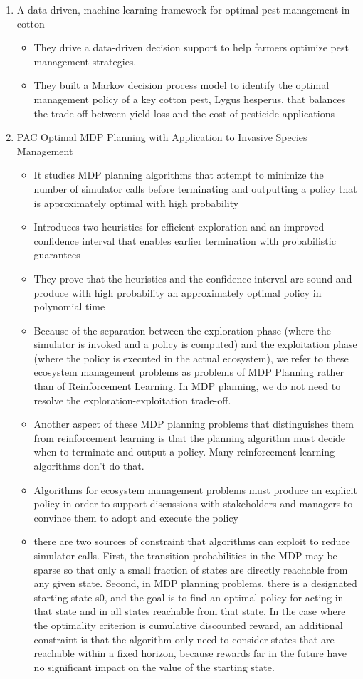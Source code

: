 \documentclass{article}
\theoremstyle{remark}
\theoremstyle{remark}
\theoremstyle{remark}
\theoremstyle{remark}
\theoremstyle{remark}
\theoremstyle{remark}
\begin{document}
\begin{enumerate}
 \item A data-driven, machine learning framework for optimal pest management in cotton \cite{ecs2.1263}
 \begin{itemize}
 	\item They drive a data-driven decision support to help farmers optimize pest management strategies.
 	\item They built a Markov decision process model to identify the optimal management policy of a key cotton pest, Lygus hesperus, that balances the trade-off between yield loss and the cost of pesticide applications
 \end{itemize}

 \item PAC Optimal MDP Planning with Application to Invasive Species Management \cite{taleghan15a}
 	\begin{itemize}
 		\item It studies MDP planning algorithms that attempt to minimize the number of simulator calls before terminating and outputting a policy that is approximately optimal with high probability
 		\item Introduces two heuristics for efficient exploration and an improved confidence interval that enables earlier termination with probabilistic guarantees
 		\item They prove that the heuristics and the confidence interval are sound and produce with high probability an approximately optimal policy in polynomial time
		\item Because of the separation between the exploration phase (where the simulator is invoked and a policy is computed) and the exploitation phase (where the policy is executed in the actual ecosystem), we refer to these ecosystem management problems as problems of MDP Planning rather than of Reinforcement Learning. In MDP planning, we do not need to resolve the exploration-exploitation trade-off.
		\item Another aspect of these MDP planning problems that distinguishes them from reinforcement learning is that the planning algorithm must decide when to terminate and output a policy. Many reinforcement learning algorithms don't do that.
		\item Algorithms for ecosystem management problems must produce an explicit policy in order to support discussions with stakeholders and managers to convince them to adopt and execute the policy
		\item there are two sources of constraint that algorithms can exploit to reduce simulator calls. First, the transition probabilities in the MDP may be sparse so that only a small fraction of states are directly reachable from any given state. Second, in MDP planning problems, there is a designated starting state s0, and the goal is to find an optimal policy for acting in that state and in all states reachable from that state. In the case where the optimality criterion is cumulative discounted reward, an additional constraint is that the algorithm only need to consider states that are reachable within a fixed horizon, because rewards far in the future have no significant impact on the value of the starting state.


\end{itemize}
\end{enumerate}
\end{document}
